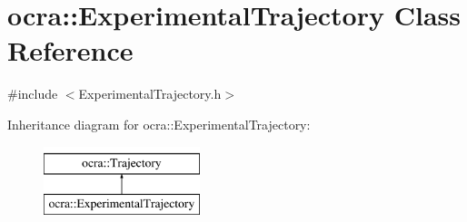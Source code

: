 \hypertarget{classocra_1_1ExperimentalTrajectory}{}\section{ocra\+:\+:Experimental\+Trajectory Class Reference}
\label{classocra_1_1ExperimentalTrajectory}


{\ttfamily \#include $<$Experimental\+Trajectory.\+h$>$}

Inheritance diagram for ocra\+:\+:Experimental\+Trajectory\+:\begin{figure}[H]
\begin{center}
\leavevmode
\includegraphics[height=2.000000cm]{d5/d74/classocra_1_1ExperimentalTrajectory}
\end{center}
\end{figure}

